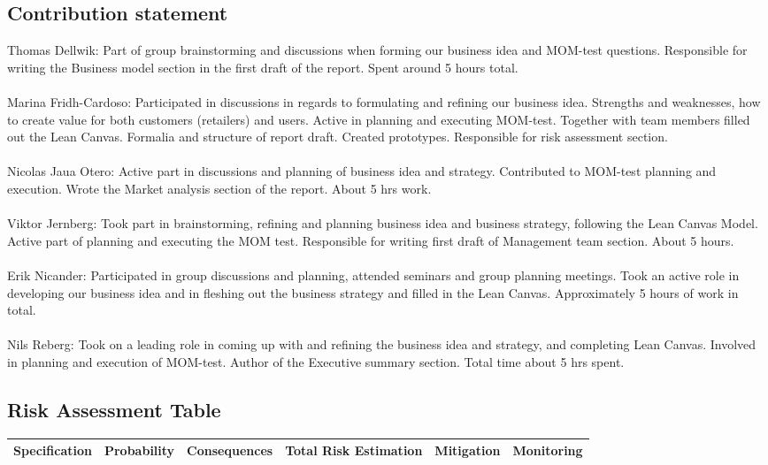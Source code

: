 \documentclass[titlepage]{article}
\begin{document}
\subsection{Contribution statement}
Thomas Dellwik: Part of group brainstorming and discussions when forming our business idea and MOM-test questions. Responsible for writing the Business model section in the first draft of the report. Spent around 5 hours total. \\
\\
Marina Fridh-Cardoso: Participated in discussions in regards to formulating and refining our business idea. Strengths and weaknesses, how to create value for both customers (retailers) and users. Active in planning and executing MOM-test. Together with team members filled out the Lean Canvas. Formalia and structure of report draft. Created prototypes. Responsible for risk assessment section. \\
\\
Nicolas Jaua Otero: Active part in discussions and planning of business idea and strategy. Contributed to MOM-test planning and execution. Wrote the Market analysis section of the report. About 5 hrs work.\\
\\
Viktor Jernberg: Took part in brainstorming, refining and planning business idea and business strategy, following the Lean Canvas Model. Active part of planning and executing the MOM test. Responsible for writing first draft of Management team section. About 5 hours.\\
\\
Erik Nicander: Participated in group discussions and planning, attended seminars and group planning meetings. Took an active role in developing our business idea and in fleshing out the business strategy and filled in the Lean Canvas. Approximately 5 hours of work in total.\\
\\
Nils Reberg: Took on a leading role in coming up with and refining the business idea and strategy, and completing Lean Canvas.  Involved in planning and execution of MOM-test. Author of the Executive summary section. Total time about 5 hrs spent.\\

\subsection{Risk Assessment Table} \label{risktable}

\begin{center}
\begin{tabular}{|p{3cm}|p{2cm}|p{2cm}|p{2cm}|p{2cm}|p{2cm}|}
\hline
 Specification & Probability & Consequences & Total Risk Estimation & Mitigation & Monitoring \\
 \hline
 \end{tabular}
\end{center}
\end{document}

